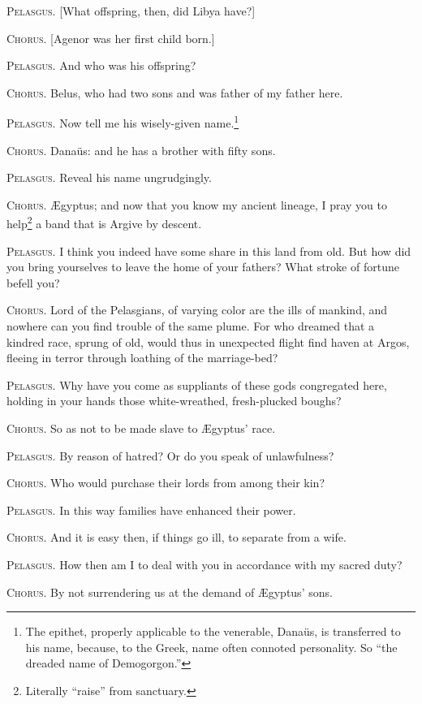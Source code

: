 \documentclass[12pt]{article}
\begin{document}
\textsc{Pelasgus.} [What offspring, then, did Libya have?]

\textsc{Chorus.} [Agenor was her first child born.]

\textsc{Pelasgus.} And who was his offspring?

\textsc{Chorus.} Belus, who had two sons and was father of my father here.

\textsc{Pelasgus.} Now tell me his wisely-given name.\footnote{The epithet, properly applicable to the venerable, Dana\"{u}s, is transferred to his name, because, to the Greek, name often connoted personality. So ``the dreaded name of Demogorgon.''}

\textsc{Chorus.} Dana\"{u}s: and he has a brother with fifty sons.

\textsc{Pelasgus.} Reveal his name ungrudgingly.

\textsc{Chorus.} {\AE}gyptus; and now that you know my ancient lineage, I pray you to help\footnote{Literally ``raise'' from sanctuary.} a band that is Argive by descent.

\textsc{Pelasgus.} I think you indeed have some share in this land from old. But how did you bring yourselves to leave the home of your fathers? What stroke of fortune befell you?

\textsc{Chorus.} Lord of the Pelasgians, of varying color are the ills of mankind, and nowhere can you find trouble of the same plume. For who dreamed that a kindred race, sprung of old, would thus in unexpected flight find haven at Argos, fleeing in terror through loathing of the marriage-bed?

\textsc{Pelasgus.} Why have you come as suppliants of these gods congregated here, holding in your hands those white-wreathed, fresh-plucked boughs?

\textsc{Chorus.} So as not to be made slave to {\AE}gyptus' race.

\textsc{Pelasgus.} By reason of hatred? Or do you speak of unlawfulness?

\textsc{Chorus.} Who would purchase their lords from among their kin?

\textsc{Pelasgus.} In this way families have enhanced their power.

\textsc{Chorus.} And it is easy then, if things go ill, to separate from a wife.

\textsc{Pelasgus.} How then am I to deal with you in accordance with my sacred duty?

\textsc{Chorus.} By not surrendering us at the demand of {\AE}gyptus' sons.
\end{document}
